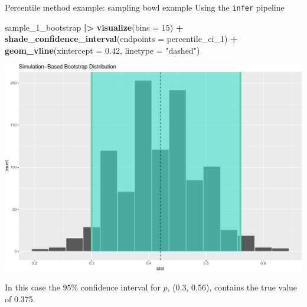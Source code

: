 \documentclass[
  ignorenonframetext,
]{beamer}
\newenvironment{Shaded}{\begin{snugshade}}{\end{snugshade}}
\newcommand{\AttributeTok}[1]{\textcolor[rgb]{0.13,0.29,0.53}{#1}}
\newcommand{\DecValTok}[1]{\textcolor[rgb]{0.00,0.00,0.81}{#1}}
\newcommand{\FloatTok}[1]{\textcolor[rgb]{0.00,0.00,0.81}{#1}}
\newcommand{\FunctionTok}[1]{\textcolor[rgb]{0.13,0.29,0.53}{\textbf{#1}}}
\newcommand{\NormalTok}[1]{#1}
\newcommand{\SpecialCharTok}[1]{\textcolor[rgb]{0.81,0.36,0.00}{\textbf{#1}}}
\newcommand{\StringTok}[1]{\textcolor[rgb]{0.31,0.60,0.02}{#1}}
\begin{document}
\begin{frame}[fragile]{Percentile method example: sampling bowl example}
\protect\hypertarget{percentile-method-example-sampling-bowl-example-1}{}
Using the \texttt{infer} pipeline

\tiny

\begin{Shaded}
\begin{Highlighting}[]
\NormalTok{sample\_1\_bootstrap }\SpecialCharTok{|\textgreater{}} 
  \FunctionTok{visualize}\NormalTok{(}\AttributeTok{bins =} \DecValTok{15}\NormalTok{) }\SpecialCharTok{+} 
  \FunctionTok{shade\_confidence\_interval}\NormalTok{(}\AttributeTok{endpoints =}\NormalTok{ percentile\_ci\_1) }\SpecialCharTok{+}
  \FunctionTok{geom\_vline}\NormalTok{(}\AttributeTok{xintercept =} \FloatTok{0.42}\NormalTok{, }\AttributeTok{linetype =} \StringTok{"dashed"}\NormalTok{)}
\end{Highlighting}
\end{Shaded}

\begin{center}\includegraphics[width=0.7\linewidth,height=0.45\textheight]{Week10_Lect_files/figure-beamer/unnamed-chunk-25-1} \end{center}
\normalsize

In this case the \(95\%\) confidence interval for \(p\), (0.3, 0.56),
contains the true value of 0.375.
\end{frame}
\end{document}
